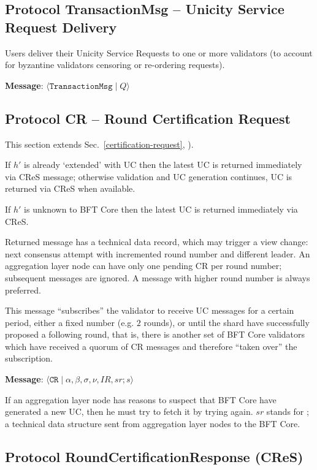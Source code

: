 \subsection{Protocol TransactionMsg -- Unicity Service Request Delivery}\label{protocol-p0-transaction-order}

Users deliver their Unicity Service Requests to one or more validators (to account for byzantine validators censoring or re-ordering requests).

\textbf{Message}: $\langle \texttt{TransactionMsg} \mid Q\rangle$


\subsection{Protocol CR -- Round Certification Request}\label{protocol-p1-block-certification}

This section extends Sec.~\ref{certification-request}, ).

If $h'$ is already `extended' with UC then the latest UC is returned
immediately via CReS message; otherwise validation and UC generation continues, UC is
returned via CReS when available.

If $h'$ is unknown to BFT Core then the latest UC is returned
immediately via CReS.

Returned message has a technical data record, which may trigger a view change: next consensus attempt with incremented round number and different leader.
An aggregation layer node can have only one pending CR per round number; subsequent messages are ignored. A message with higher round number is always preferred.

This message ``subscribes'' the validator to receive UC messages for a certain period, either a fixed number (e.g. $2$ rounds), or until the shard have successfully proposed a following round, that is, there is another set of BFT Core validators which have received a quorum of CR messages and therefore ``taken over'' the subscription.

\textbf{Message}: $\langle \texttt{CR} \mid \alpha, \beta, \sigma, \nu, IR, sr; s \rangle$

If an aggregation layer node has reasons to suspect that BFT Core have generated a new UC, then he must try to fetch it by trying again. $sr$ stands for ; a technical data structure sent from aggregation layer nodes to the BFT Core.

\subsection{Protocol RoundCertificationResponse (CReS)}

